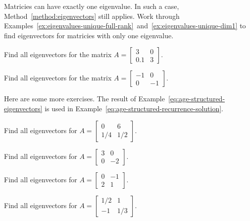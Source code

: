 \documentclass[../main.tex]{subfiles}
\begin{document}
\clearpage

\faStar{} Matricies can have exactly one eigenvalue. In such a case, Method~\ref{method:eigenvectors} still applies. Work through Examples~\ref{ex:eigenvalues-unique-full-rank}~and~\ref{ex:eigenvalues-unique-dim1} to find eigenvectors for matricies with only one eigenvalue.
\begin{example} \label{ex:eigenvalues-unique-full-rank}
  Find all eigenvectors for the matrix \(A = \begin{bmatrix} 3 & 0 \\ 0.1 & 3 \end{bmatrix}\).
\end{example}

\begin{example} \label{ex:eigenvalues-unique-dim1}
  Find all eigenvectors for the matrix \(A = \begin{bmatrix} -1 & 0 \\ 0 & -1 \end{bmatrix}\).
\end{example}
\clearpage

Here are some more exercises.  The result of Example~\ref{eq:age-structured-eigenvectors} is used in Example~\ref{eq:age-structured-recurrence-solution}.

\begin{example} \label{eq:age-structured-eigenvectors}
  Find all eigenvectors for \(A = \begin{bmatrix} 0 & 6 \\ 1/4 & 1/2 \end{bmatrix}\).

\end{example}

\begin{example}
  Find all eigenvectors for \(A = \begin{bmatrix} 3 & 0 \\ 0 & -2 \end{bmatrix}\).

\end{example}
\clearpage

\begin{example}
  Find all eigenvectors for \(A = \begin{bmatrix} 0 & -1 \\ 2 & 1 \end{bmatrix}\).

\end{example}
\clearpage

\begin{example}
  Find all eigenvectors for \(A = \begin{bmatrix} 1/2 & 1 \\ -1 & 1/3 \end{bmatrix}\).

\end{example}
\clearpage
\end{document}
